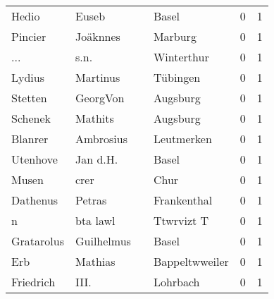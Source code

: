 \begin{center}
\begin{tiny}
\begin{longtabu}{llllrr}
                    Hedio &                              Euseb &             &                                       Basel &          0 &         1 \\
                  Pincier &                           Joäknnes &             &                                     Marburg &          0 &         1 \\
                      ... &                               s.n. &             &                                  Winterthur &          0 &         1 \\
                   Lydius &                           Martinus &             &                                    Tübingen &          0 &         1 \\
                  Stetten &                           GeorgVon &             &                                    Augsburg &          0 &         1 \\
                  Schenek &                            Mathits &             &                                    Augsburg &          0 &         1 \\
                  Blanrer &                          Ambrosius &             &                                  Leutmerken &          0 &         1 \\
                 Utenhove &                           Jan d.H. &             &                                       Basel &          0 &         1 \\
                    Musen &                               crer &             &                                        Chur &          0 &         1 \\
                 Dathenus &                             Petras &             &                                 Frankenthal &          0 &         1 \\
                        n &                           bta lawl &             &                                  Ttwrvizt T &          0 &         1 \\
               Gratarolus &                         Guilhelmus &             &                                       Basel &          0 &         1 \\
                      Erb &                            Mathias &             &                              Bappeltwweiler &          0 &         1 \\
                Friedrich &                               III. &             &                                    Lohrbach &          0 &         1 \\

\end{longtabu}
\end{tiny}
\end{center}
